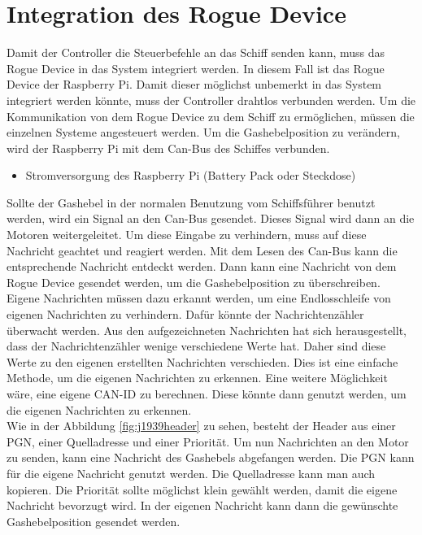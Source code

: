\section{Integration des Rogue Device}
Damit der Controller die Steuerbefehle an das Schiff senden kann, muss das Rogue Device in das System integriert werden.
In diesem Fall ist das Rogue Device der Raspberry Pi. Damit dieser möglichst unbemerkt in das System integriert werden könnte,
muss der Controller drahtlos verbunden werden. Um die Kommunikation von dem Rogue Device zu dem Schiff zu ermöglichen, müssen
die einzelnen Systeme angesteuert werden. Um die Gashebelposition zu verändern, wird der Raspberry Pi mit dem Can-Bus des Schiffes
verbunden. 
\begin{itemize}
    \item Stromversorgung des Raspberry Pi (Battery Pack oder Steckdose)
\end{itemize}

Sollte der Gashebel in der normalen Benutzung vom Schiffsführer benutzt werden, wird ein Signal an den Can-Bus gesendet. Dieses Signal wird dann an die Motoren weitergeleitet.
Um diese Eingabe zu verhindern, muss auf diese Nachricht geachtet und reagiert werden. Mit dem Lesen des Can-Bus kann die 
entsprechende Nachricht entdeckt werden. Dann kann eine Nachricht von dem Rogue Device gesendet werden, um die Gashebelposition
zu überschreiben. Eigene Nachrichten müssen dazu erkannt werden, um eine Endlosschleife von eigenen Nachrichten zu verhindern. Dafür könnte
der Nachrichtenzähler überwacht werden. Aus den aufgezeichneten Nachrichten hat sich herausgestellt, dass der 
Nachrichtenzähler wenige verschiedene Werte hat. Daher sind diese Werte zu den eigenen erstellten Nachrichten 
verschieden. Dies ist eine einfache Methode, um die eigenen Nachrichten zu erkennen. Eine weitere Möglichkeit wäre,
eine eigene CAN-ID zu berechnen. Diese könnte dann genutzt werden, um die eigenen Nachrichten zu erkennen.
\\


Wie in der Abbildung \ref{fig:j1939header} zu sehen, besteht der Header aus einer PGN, einer Quelladresse und einer Priorität. Um nun Nachrichten
an den Motor zu senden, kann eine Nachricht des Gashebels abgefangen werden. Die PGN kann für die eigene Nachricht genutzt
werden. Die Quelladresse kann man auch kopieren. Die Priorität sollte möglichst klein gewählt werden, 
damit die eigene Nachricht bevorzugt wird. In der eigenen Nachricht kann dann die gewünschte Gashebelposition gesendet werden.

